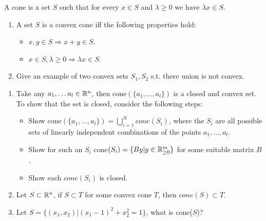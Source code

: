 \documentclass{ExerciseSheet}
\newif\ifsolutions
\begin{document}
\begin{exo}
A cone is a set $S$ such that for every $x\in S$ and $\lambda \geq 0$ we have $\lambda x \in S$.

\begin{enumerate}
    \item A set $S$ is a convex cone iff the following properties hold:
    \begin{itemize}
        \item $x,y \in S \Rightarrow x+y \in S$.
        \item $x\in S, \lambda \geq 0 \Rightarrow \lambda x \in S$.
    \end{itemize}
    \item Give an example of two convex sets $S_1, S_2$ s.t. there union is not convex. 
\end{enumerate}
\end{exo}

\ifsolutions
\vskip 0.3cm
\begin{solution}
\begin{enumerate}
    \item 
\end{enumerate}
\end{solution}

\fi

\vskip 0.5cm
\begin{exo}
\begin{enumerate}
    \item Take any $a_1, \dots a_l \in \mathbb{R}^n$, then $\text{cone}(\{a_1, \dots, a_l\})$ is a closed and convex set.
     To show that the set is closed, consider the following steps:
     \begin{itemize}
         \item Show cone$(\{a_1,...,a_l\})= \bigcup_{i=1}^N cone(S_i)$, where the $S_i$ are all possible sets of linearly independent combinations of the points $a_1,...,a_l$.
         \item Show for such an $S_i$ cone$(S_i)=\{By | y\in \mathbb{R}^m_{\geq 0}\}$ for some suitable matrix $B$.
         \item Show each $cone(S_i)$ is closed. 
     \end{itemize}
    \item Let $S\subset \mathbb{R}^n$, if $S\subset T$ for some convex cone $T$, then $cone(S)\subset T$.
   
    \item Let $S=\{(x_1, x_2) | (x_1-1)^2 +x_2^2 = 1\}$, what is cone($S$)?
\end{enumerate}
\end{exo}


\ifsolutions
\vskip 0.3cm
\begin{solution}
\end{solution}
\fi
\end{document}
